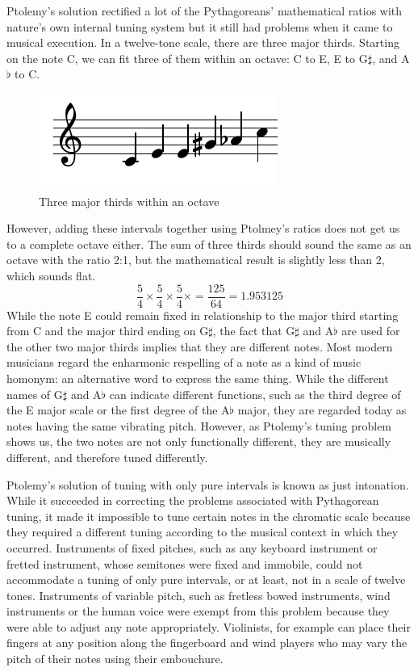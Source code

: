 Ptolemy's solution rectified a lot of the Pythagoreans' mathematical ratios with nature's
own internal tuning system but it still had problems when it came to musical execution.
In a twelve-tone scale, there are three major thirds. Starting on the note C, we can fit
three of them within an octave: C to E, E to G$\sharp$, and A$\flat$ to C.
\begin{figure}[h]
\centering
\includegraphics{examples/thirds.pdf}
\caption{Three major thirds within an octave}
\end{figure}
However, adding these intervals together using Ptolmey's ratios does not get us to a
complete octave either.  The sum of three thirds should sound the same as an octave with
the ratio 2:1, but the mathematical result is slightly less than 2, which sounds flat.
\begin{equation}
    \frac{5}{4} \times
    \frac{5}{4} \times
    \frac{5}{4} \times = \frac{125}{64} = 1.953125
\end{equation}
While the note E could remain fixed in relationship to the major third starting from C and
the major third ending on G$\sharp$, the fact that G$\sharp$ and A$\flat$ are used for the other
two major thirds implies that they are different notes. Most modern musicians regard the
enharmonic respelling of a note as a kind of music homonym: an alternative word to express
the same thing.  While the different names of G$\sharp$ and A$\flat$ can indicate different
functions, such as the third degree of the E major scale or the first degree of the A$\flat$
major, they are regarded today as notes having the same vibrating pitch. However, as
Ptolemy's tuning problem shows us, the two notes are not only functionally different, they
are musically different, and therefore tuned differently.

Ptolemy's solution of tuning with only pure intervals is known as just intonation.  While
it succeeded in correcting the problems associated with Pythagorean tuning, it made it
impossible to tune certain notes in the chromatic scale because they required a different
tuning according to the musical context in which they occurred.  Instruments of fixed pitches,
such as any keyboard instrument or fretted instrument, whose semitones were fixed and
immobile, could not accommodate a tuning of only pure intervals, or at least, not in a
scale of twelve tones.  Instruments of variable pitch, such as fretless bowed instruments,
wind instruments or the human voice were exempt from this problem because they were able
to adjust any note appropriately.  Violinists,
for example can place their fingers at any position along the fingerboard and wind players
who may vary the pitch of their notes using their embouchure.

